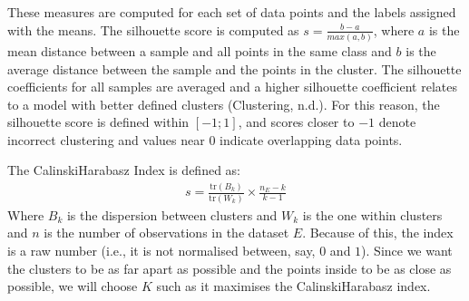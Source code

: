 \documentclass[letterpaper,10pt,english]{jupyterBook}
\begin{document}
\sphinxAtStartPar
These measures are computed for each set of data points and the labels assigned with the \sphinxhyphen{}means. The silhouette score is computed as \(s = \frac{b - a}{max(a, b)}\), where \(a\) is the mean distance between a sample and all points in the same class and \(b\) is the average distance between the sample and the points in the  cluster. The silhouette coefficients for all samples are averaged and a higher silhouette coefficient relates to a model with better defined clusters (Clustering, n.d.). For this reason, the silhouette score is defined within \([-1;1]\), and scores closer to \(-1\) denote incorrect clustering and values near \(0\) indicate overlapping data points.

\sphinxAtStartPar
The Calinski\sphinxhyphen{}Harabasz Index is defined as:
\begin{equation*}
\begin{split}
s = \frac{\mathrm{tr}(B_k)}{\mathrm{tr}(W_k)} \times \frac{n_E - k}{k - 1}
\end{split}
\end{equation*}
\sphinxAtStartPar
Where \(B_k\) is the dispersion between clusters and \(W_k\) is the one within clusters and \(n\) is the number of observations in the dataset \(E\). Because of this, the index is a raw number (i.e., it is not normalised between, say, \(0\) and \(1\)). Since we want the clusters to be as far apart as possible and the points inside to be as close as possible, we will choose \(K\) such as it maximises the Calinski\sphinxhyphen{}Harabasz index.
\end{document}
